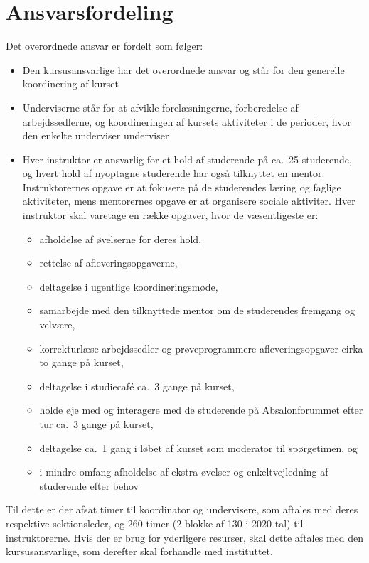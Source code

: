 \documentclass[a4paper]{article}
\begin{document}
\section{Ansvarsfordeling}
Det overordnede ansvar er fordelt som følger:
\begin{itemize}
\item Den kursusansvarlige har det overordnede ansvar og står for den
  generelle koordinering af kurset
\item Underviserne står for at afvikle forelæsningerne, forberedelse
  af arbejdssedlerne, og koordineringen af kursets aktiviteter i de
  perioder, hvor den enkelte underviser underviser
\item Hver instruktor er ansvarlig for et hold af studerende på ca.\ 25
  studerende, og hvert hold af nyoptagne studerende har også
  tilknyttet en mentor. Instruktorernes opgave er at fokusere på de
  studerendes læring og faglige aktiviteter, mens mentorernes opgave
  er at organisere sociale aktiviter. Hver instruktor skal varetage en
  række opgaver, hvor de væsentligeste er:
  \begin{itemize}
  \item afholdelse af øvelserne for deres hold,
  \item rettelse af afleveringsopgaverne,
  \item deltagelse i ugentlige koordineringsmøde,
  \item samarbejde med den tilknyttede mentor om de studerendes
    fremgang og velvære,
  \item korrekturlæse arbejdssedler og prøveprogrammere
    afleveringsopgaver cirka to gange på kurset,
  \item deltagelse i studiecaf{\'e} ca.\ 3 gange på kurset,
  \item holde øje med og interagere med de studerende på
    Absalonforummet efter tur ca.\ 3 gange på kurset,
  \item deltagelse ca.\ 1 gang i løbet af kurset som moderator til
    spørgetimen, og
  \item i mindre omfang afholdelse af ekstra øvelser og enkeltvejledning af
    studerende efter behov
  \end{itemize}
\end{itemize}
Til dette er der afsat timer til koordinator og undervisere, som
aftales med deres respektive sektionsleder, og 260 timer (2 blokke af
130 i 2020 tal) til instruktorerne. Hvis der er brug for yderligere
resurser, skal dette aftales med den kursusansvarlige, som derefter skal
forhandle med instituttet.
\end{document}
